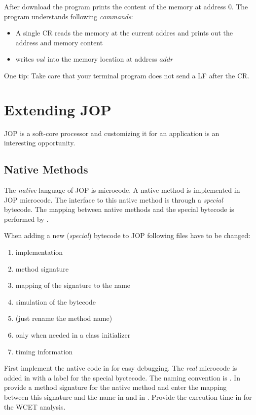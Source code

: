 After download the program prints the content of the memory at
address 0. The program understands following \emph{commands}:

\begin{itemize}
    \item A single CR reads the memory at the current addres
    and prints out the address and memory content
    \item {} writes $val$ into the memory location at
    address $addr$
\end{itemize}

One tip: Take care that your terminal program does not send a LF
after the CR.


\section{Extending JOP}

JOP is a soft-core processor and customizing it for an application
is an interesting opportunity.

\subsection{Native Methods}

 The \emph{native} language of JOP is microcode.
A native method is implemented in JOP microcode. The interface to
this native method is through a \emph{special} bytecode. The mapping
between native methods and the special bytecode is performed by
.

When adding a new (\emph{special}) bytecode to JOP following files
have to be changed:
\begin{enumerate}
    \item {} implementation
    \item {} method signature
    \item {} mapping of the signature to the name
    \item {} simulation of the bytecode
    \item {} (just rename the method name)
    \item {} only when needed in a class initializer
    \item {} timing information
\end{enumerate}

First implement the native code in  for easy
debugging. The \emph{real} microcode is added in  with
a label for the special byctecode. The naming convention is
. In  provide a method
signature for the native method and enter the mapping between this
signature and the name in  and in
. Provide the execution time in
 for the WCET analysis.

